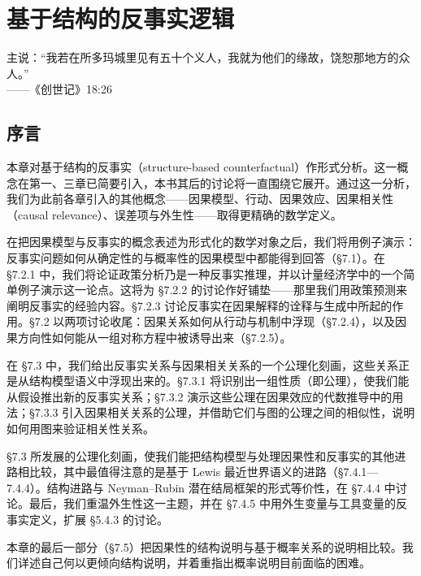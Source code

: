 \chapter{基于结构的反事实逻辑}

\begin{flushright}
\kaishu\small
主说：“我若在所多玛城里见有五十个义人，我就为他们的缘故，饶恕那地方的众人。”\\[2pt]
——《创世记》18:26
\end{flushright}

\section*{序言}

本章对基于结构的反事实（structure-based counterfactual）作形式分析。这一概念在第一、三章已简要引入，本书其后的讨论将一直围绕它展开。通过这一分析，我们为此前各章引入的其他概念——因果模型、行动、因果效应、因果相关性（causal relevance）、误差项与外生性——取得更精确的数学定义。

在把因果模型与反事实的概念表述为形式化的数学对象之后，我们将用例子演示：反事实问题如何从确定性的与概率性的因果模型中都能得到回答（\S 7.1）。在 \S 7.2.1 中，我们将论证政策分析乃是一种反事实推理，并以计量经济学中的一个简单例子演示这一论点。这将为 \S 7.2.2 的讨论作好铺垫——那里我们用政策预测来阐明反事实的经验内容。\S 7.2.3 讨论反事实在因果解释的诠释与生成中所起的作用。\S 7.2 以两项讨论收尾：因果关系如何从行动与机制中浮现（\S 7.2.4），以及因果方向性如何能从一组对称方程中被诱导出来（\S 7.2.5）。

在 \S 7.3 中，我们给出反事实关系与因果相关关系的一个公理化刻画，这些关系正是从结构模型语义中浮现出来的。\S 7.3.1 将识别出一组性质（即公理），使我们能从假设推出新的反事实关系；\S 7.3.2 演示这些公理在因果效应的代数推导中的用法；\S 7.3.3 引入因果相关关系的公理，并借助它们与图的公理之间的相似性，说明如何用图来验证相关性关系。

\S 7.3 所发展的公理化刻画，使我们能把结构模型与处理因果性和反事实的其他进路相比较，其中最值得注意的是基于 Lewis 最近世界语义的进路（\S 7.4.1—7.4.4）。结构进路与 Neyman–Rubin 潜在结局框架的形式等价性，在 \S 7.4.4 中讨论。最后，我们重温外生性这一主题，并在 \S 7.4.5 中用外生变量与工具变量的反事实定义，扩展 \S 5.4.3 的讨论。

本章的最后一部分（\S 7.5）把因果性的结构说明与基于概率关系的说明相比较。我们详述自己何以更倾向结构说明，并着重指出概率说明目前面临的困难。

